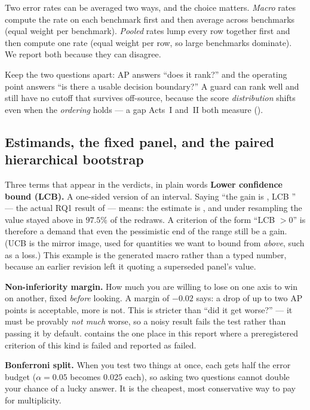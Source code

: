 Two error rates can be averaged two ways, and the choice matters. \emph{Macro} rates compute the rate
on each benchmark first and then average across benchmarks (equal weight per benchmark). \emph{Pooled}
rates lump every row together first and then compute one rate (equal weight per row, so large
benchmarks dominate). We report both because they can disagree.

Keep the two questions apart: AP answers ``does it rank?'' and the operating point answers ``is there a
usable decision boundary?'' A guard can rank well and still have no cutoff that survives off-source,
because the score \emph{distribution} shifts even when the \emph{ordering} holds --- a gap Acts~I and~II
both measure ().

\subsection{Estimands, the fixed panel, and the paired hierarchical bootstrap}
\label{sec:bg-estimand}

\begin{background}{Three terms that appear in the verdicts, in plain words}
\textbf{Lower confidence bound (LCB).} A one-sided version of an interval. Saying ``the gain is
\AdaHGain{}, LCB \AdaHGainLCB'' --- the actual RQ1 result of  --- means: the
estimate is \AdaHGain{}, and under resampling the value stayed above \AdaHGainLCB{} in $97.5\%$ of the
redraws. A criterion of the form ``LCB $>0$'' is therefore a demand that even
the pessimistic end of the range still be a gain. (UCB is the mirror image, used for quantities we want
to bound from \emph{above}, such as a loss.) This example is the generated macro rather than a typed
number, because an earlier revision left it quoting a superseded panel's value.

\textbf{Non-inferiority margin.} How much you are willing to lose on one axis to win on another, fixed
\emph{before} looking. A margin of $-0.02$ says: a drop of up to two AP points is acceptable, more is
not. This is stricter than ``did it get worse?'' --- it must be provably \emph{not much} worse, so a
noisy result fails the test rather than passing it by default.  contains the one
place in this report where a preregistered criterion of this kind is failed and reported as failed.

\textbf{Bonferroni split.} When you test two things at once, each gets half the error budget
($\alpha=0.05$ becomes $0.025$ each), so asking two questions cannot double your chance of a lucky
answer. It is the cheapest, most conservative way to pay for multiplicity.
\end{background}

